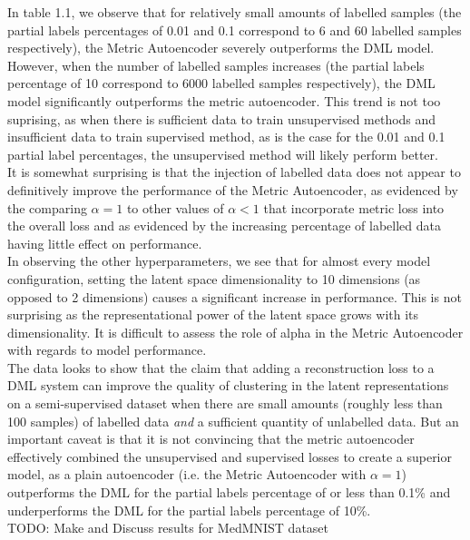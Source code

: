 \documentclass[./dissertation.tex]{subfiles}
\begin{document}
   In table 1.1, we observe that for relatively small amounts of labelled samples (the partial labels percentages of 0.01 and 0.1 correspond to 6 and 60 labelled samples respectively), the Metric Autoencoder severely outperforms the DML model. However, when the number of labelled samples increases (the partial labels percentage of 10 correspond to 6000 labelled samples respectively), the DML model significantly outperforms the metric autoencoder. This trend is not too suprising, as when there is sufficient data to train unsupervised methods and insufficient data to train supervised method, as is the case for the 0.01 and 0.1 partial label percentages, the unsupervised method will likely perform better. \\
   
   It is somewhat surprising is that the injection of labelled data does not appear to definitively improve the performance of the Metric Autoencoder, as evidenced by the comparing $\alpha=1$ to other values of $\alpha < 1$ that incorporate metric loss into the overall loss and as evidenced by the increasing percentage of labelled data having little effect on performance. \\ 
   
   In observing the other hyperparameters, we see that for almost every model configuration, setting the latent space dimensionality to 10 dimensions (as opposed to 2 dimensions) causes a significant increase in performance. This is not surprising as the representational power of the latent space grows with its dimensionality. It is difficult to assess the role of alpha in the Metric Autoencoder with regards to model performance. \\
   
   The data looks to show that the claim that adding a reconstruction loss to a DML system can improve the quality of clustering in the latent representations on a semi-supervised dataset when there are small amounts (roughly less than 100 samples) of labelled data \textit{and} a sufficient quantity of unlabelled data. But an important caveat is that it is not convincing that the metric autoencoder effectively combined the unsupervised and supervised losses to create a superior model, as a plain autoencoder (i.e. the Metric Autoencoder with $\alpha = 1$) outperforms the DML for the partial labels percentage of or less than 0.1\% and underperforms the DML for the partial labels percentage of 10\%. \\
   
   TODO: Make and Discuss results for MedMNIST dataset
\end{document}

